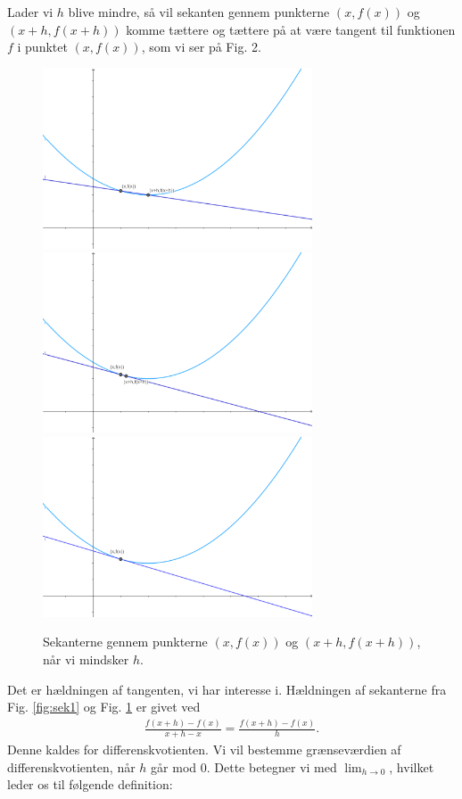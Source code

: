 Lader vi $h$ blive mindre, så vil sekanten gennem punkterne $(x,f(x))$ og $(x+h,f(x+h))$ komme tættere og tættere på at være tangent til funktionen $f$ i punktet $(x,f(x))$, som vi ser på Fig. 2.
\begin{figure}[H]
\includegraphics[width = 8cm]{Billeder/sekant2.png}
\includegraphics[width = 8cm]{Billeder/sekant3.png}
\includegraphics[width=8cm]{Billeder/tangent1.png}
\caption{Sekanterne gennem punkterne $(x,f(x))$ og $(x+h,f(x+h))$, når vi mindsker $h$. }
\label{fig:sek2}
\end{figure}
Det er hældningen af tangenten, vi har interesse i. Hældningen af sekanterne fra Fig. \ref{fig:sek1} og Fig. \ref{fig:sek2} er givet ved
\begin{align*}
\frac{f(x+h)-f(x)}{x+h-x} = \frac{f(x+h)-f(x)}{h}.
\end{align*}
Denne kaldes for differenskvotienten. Vi vil bestemme grænseværdien af differenskvotienten, når $h$ går mod $0$. Dette betegner vi med $\lim_{h\to 0}$, hvilket leder os til følgende definition:
